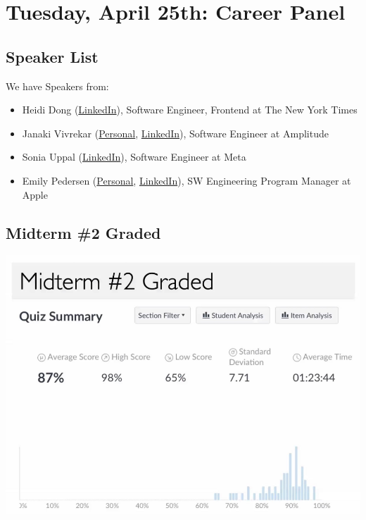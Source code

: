\section{Tuesday, April 25th: Career Panel}
\subsection{Speaker List}
We have Speakers from:
\begin{itemize}
    \item Heidi Dong (\href{https://www.linkedin.com/in/heididong/}{LinkedIn}), Software Engineer, Frontend at The New York Times

    \item Janaki Vivrekar (\href{https://janakivivrekar.com/}{Personal}, \href{https://www.linkedin.com/in/janaki-vivrekar/}{LinkedIn}), Software Engineer at Amplitude

    \item Sonia Uppal (\href{https://www.linkedin.com/in/soniau/}{LinkedIn}), Software Engineer at Meta

    \item Emily Pedersen (\href{https://www.emilypedersen.me/}{Personal}, \href{https://www.linkedin.com/in/epedersen1/}{LinkedIn}), SW Engineering Program Manager at Apple
\end{itemize}

\subsection{Midterm \#2 Graded}
\includegraphics{lectures/wk14/img/mt2_distro.png}

